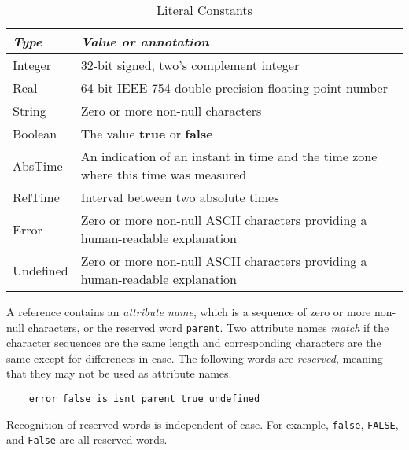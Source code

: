 \documentclass{article}
\begin{document}
\begin{table}[ht]
\begin{center}
\begin{tabular}{lp{4in}}
\emph{Type} & \emph{Value or annotation} \\ \hline
Integer & 32-bit signed, two's complement integer \\
Real    & 64-bit IEEE 754 double-precision floating point number \\
String  & Zero or more non-null characters\protect\footnotemark \\
Boolean & The value \textbf{true} or \textbf{false} \\
AbsTime & An indication of an instant in time and the time zone where this
            time was measured\protect\footnotemark \\
RelTime & Interval between two absolute times\protect\footnotemark \\
Error   & Zero or more non-null ASCII characters providing a human-readable
            explanation \\
Undefined & Zero or more non-null ASCII characters providing a human-readable
            explanation
\end{tabular}
\caption{Literal Constants}
\label{tab:literals}
\end{center}
\end{table}
\addtocounter{footnote}{-2}
\addtocounter{footnote}{1}
\addtocounter{footnote}{1}

A reference contains an \emph{attribute name}, which is a sequence of zero or
more non-null characters, or the reserved word \texttt{parent}.
Two attribute names \emph{match} if the
character sequences are the same length and corresponding characters are the
same except for differences in case.  The following words are \emph{reserved},
meaning that they may not be used as attribute names.
\begin{verbatim}
    error false is isnt parent true undefined
\end{verbatim}
Recognition of reserved words is independent of case.  For example,
\texttt{false}, \texttt{FALSE}, and \texttt{False} are all reserved words.
\end{document}
